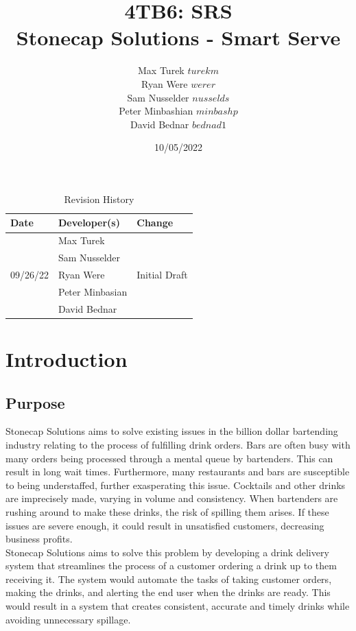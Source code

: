 \documentclass{article}
\title{\textbf{4TB6: SRS}\\
\addlinespace
\addlinespace
\addlinespace
\addlinespace
\large \textbf{Stonecap Solutions - Smart Serve}
\addlinespace
\addlinespace
\addlinespace
\addlinespace}
\author{Max Turek $turekm$\\Ryan Were $werer$\\Sam Nusselder $nusselds$\\Peter Minbashian $minbashp$\\David Bednar $bednad1$}
\date{10/05/2022}
\begin{document}
\maketitle
\newpage
\tableofcontents

\newpage

    \begin{table}[hp]
    \caption{Revision History} \label{TblRevisionHistory}
    \hline
        \begin{tabularx}{\textwidth}{llX}
        \toprule
        \textbf{Date} & \textbf{Developer(s)} & \textbf{Change}\\
        \midrule
        & Max Turek & \\
        & Sam Nusselder &  \\
        09/26/22 & Ryan Were & Initial Draft\\
        & Peter Minbasian & \\
        & David Bednar & \\
        \bottomrule
        \hline
        \end{tabularx}
    \end{table}

\newpage
\section{Introduction}
\subsection{Purpose} %
    Stonecap Solutions aims to solve existing issues in the billion dollar bartending industry relating to the process of fulfilling drink orders. Bars are often busy with many orders being processed through a mental queue by bartenders. This can result in long wait times. Furthermore, many restaurants and bars are susceptible to being understaffed, further exasperating this issue. Cocktails and other drinks are imprecisely made, varying in volume and consistency. When bartenders are rushing around to make these drinks, the risk of spilling them arises. If these issues are severe enough, it could result in unsatisfied customers, decreasing business profits. \\

    Stonecap Solutions aims to solve this problem by developing a drink delivery system that streamlines the process of a customer ordering a drink up to them receiving it. The system would automate the tasks of taking customer orders, making the drinks, and alerting the end user when the drinks are ready. This would result in a system that creates consistent, accurate and timely drinks while avoiding unnecessary spillage.
\end{document}
